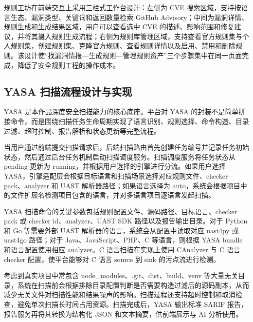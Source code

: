 \documentclass[a4paper,12pt,UTF8]{ctexart}
\numberwithin{figure}{section}
\numberwithin{table}{section}
\numberwithin{equation}{section}
\begin{document}
{\songti
规则工坊在前端交互上采用三栏式工作台设计：左侧为 CVE 搜索区域，支持按语言生态、漏洞类型、关键词和返回数量检索 GitHub Advisory；中间为漏洞详情、规则生成和生成结果区域，用户可以查看选中 CVE 的描述、影响范围和修复建议，并将其摄入规则生成流程；右侧为规则库管理区域，支持查看官方规则集与个人规则集，创建规则集、克隆官方规则、查看规则详情以及启用、禁用和删除规则。该设计使“找漏洞情报—生成规则—管理规则资产”三个步骤集中在同一页面完成，降低了安全规则工程的操作成本。
\par}

\subsection{YASA 扫描流程设计与实现}

{\songti
YASA 是本作品深度安全扫描能力的核心底座。平台对 YASA 的封装不是简单拼接命令，而是围绕扫描任务生命周期实现了语言识别、规则选择、命令构造、目录过滤、超时控制、报告解析和状态更新等完整流程。

当用户通过前端提交扫描请求后，后端扫描路由首先创建任务编号并记录任务初始状态，然后通过后台任务机制启动扫描调度服务。扫描调度服务将任务状态从 pending 更新为 running，并根据用户选择的引擎进行分流。如果用户选择 YASA，引擎适配层会根据目标语言和扫描场景选择对应规则文件、checker pack、analyzer 和 UAST 解析器路径；如果语言选择为 auto，系统会根据项目中的文件扩展名检测项目包含的语言，并对多语言项目逐语言发起扫描。

YASA 扫描命令的关键参数包括规则配置文件、源码路径、目标语言、checker pack 或 checker id、analyzer、UAST SDK 路径以及报告输出目录。对于 Python 和 Go 等需要外部 UAST 解析器的语言，系统会从配置中读取对应 uast4py 或 uast4go 路径；对于 Java、JavaScript、PHP、C 等语言，则根据 YASA bundle 和语言配置使用相应 analyzer。C 语言扫描在实现上使用 CAnalyzer 与 C 语言 checker 配置，使平台能够对 C 语言 source 到 sink 的污点流进行检测。

考虑到真实项目中常包含 node\_modules、.git、dist、build、venv 等大量无关目录，系统在扫描前会根据排除目录配置判断是否需要构造过滤后的源码副本，从而减少无关文件对扫描性能和结果噪声的影响。扫描过程还支持超时控制和取消检查，避免单次扫描长时间占用资源。扫描完成后，YASA 输出标准 SARIF 报告，报告服务再将其转换为结构化 JSON 和文本摘要，供前端展示与 AI 分析使用。
\par}
\end{document}

